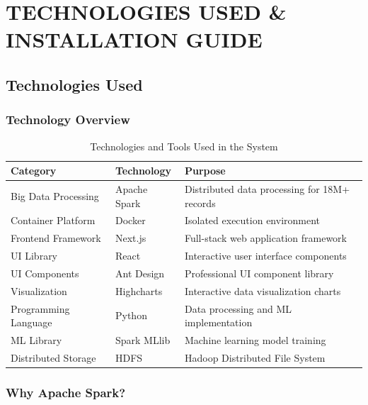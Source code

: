 \documentclass[12pt,a4paper]{report}
\begin{document}
\chapter{TECHNOLOGIES USED \& \\ INSTALLATION GUIDE}

\section{Technologies Used}

\subsection{Technology Overview}

\begin{table}[h]
    \centering
    \label{tab:technologies}
    \begin{tabular}{|l|l|p{7cm}|}
        \hline
        \textbf{Category} & \textbf{Technology} & \textbf{Purpose} \\
        \hline
        Big Data Processing & Apache Spark & Distributed data processing for 18M+ records \\
        \hline
        Container Platform & Docker & Isolated execution environment \\
        \hline
        Frontend Framework & Next.js & Full-stack web application framework \\
        \hline
        UI Library & React & Interactive user interface components \\
        \hline
        UI Components & Ant Design & Professional UI component library \\
        \hline
        Visualization & Highcharts & Interactive data visualization charts \\
        \hline
        Programming Language & Python & Data processing and ML implementation \\
        \hline
        ML Library & Spark MLlib & Machine learning model training \\
        \hline
        Distributed Storage & HDFS & Hadoop Distributed File System \\
        \hline
    \end{tabular}
    \caption{Technologies and Tools Used in the System}
\end{table}

\subsection{Why Apache Spark?}
\end{document}
